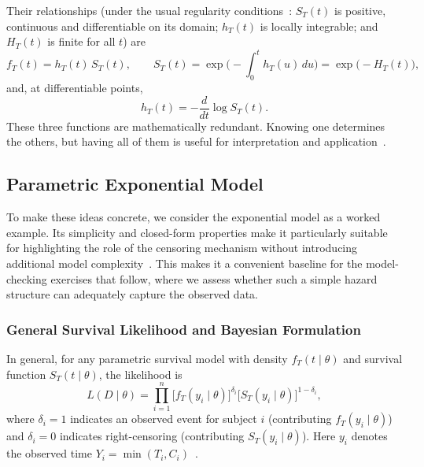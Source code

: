Their relationships (under the usual regularity conditions~\cite{kleinbaum1996survival}: $S_T(t)$ is positive, continuous and differentiable on its domain; $h_T(t)$ is locally integrable; and $H_T(t)$ is finite for all $t$) are
\begin{equation}
    f_T(t)=h_T(t)\,S_T(t),\qquad
S_T(t)=\exp\!\Big(-\!\int_0^{t} h_T(u)\,du\Big)=\exp\!\big(-H_T(t)\big),
\label{eq:4}
\end{equation}
and, at differentiable points,
\begin{equation}
    h_T(t)=-\frac{d}{dt}\log S_T(t).
\end{equation}
These three functions are mathematically redundant. Knowing one determines the others, but having all of them is useful for interpretation and application~\cite{kalbfleisch2002statistical}.





\subsection{Parametric Exponential Model} \label{Exponential Model}
To make these ideas concrete, we consider the exponential model as a worked example. Its simplicity and closed-form properties make it particularly suitable for highlighting the role of the censoring mechanism without introducing additional model complexity~\cite{kalbfleisch2002statistical, lawless2011statistical}. This makes it a convenient baseline for the model-checking exercises that follow, where we assess whether such a simple hazard structure can adequately capture the observed data.

\subsubsection{General Survival Likelihood and Bayesian Formulation}
In general, for any parametric survival model with density $f_T(t\mid\theta)$ and survival function $S_T(t\mid\theta)$, the likelihood is
\begin{equation}
L( D \mid \theta)
= \prod_{i=1}^n
\big[ f_T(y_i \mid \theta) \big]^{\delta_i}
\big[ S_T(y_i \mid \theta) \big]^{1 - \delta_i},
\label{eq:8}
\end{equation}
where $\delta_i=1$ indicates an observed event for subject $i$ (contributing $f_T(y_i\mid\theta)$) and $\delta_i=0$ indicates right-censoring (contributing $S_T(y_i\mid\theta)$). Here $y_i$ denotes the observed time $Y_i=\min(T_i,C_i)$~\cite{ibrahim2013bayesian}. 

